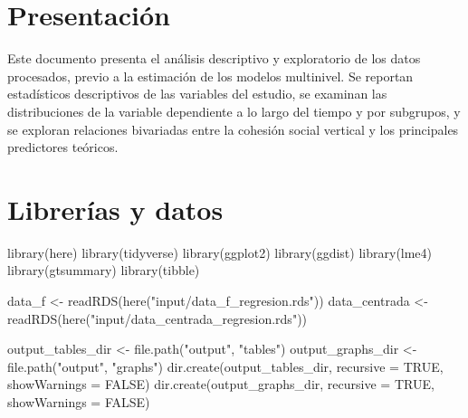 \documentclass[
  spanish,
  a4paper,
  oneside]{scrbook}
\newenvironment{Shaded}{\begin{snugshade}}{\end{snugshade}}
\newcommand{\AttributeTok}[1]{\textcolor[rgb]{0.40,0.45,0.13}{#1}}
\newcommand{\ConstantTok}[1]{\textcolor[rgb]{0.56,0.35,0.01}{#1}}
\newcommand{\FunctionTok}[1]{\textcolor[rgb]{0.28,0.35,0.67}{#1}}
\newcommand{\NormalTok}[1]{\textcolor[rgb]{0.00,0.23,0.31}{#1}}
\newcommand{\OtherTok}[1]{\textcolor[rgb]{0.00,0.23,0.31}{#1}}
\newcommand{\StringTok}[1]{\textcolor[rgb]{0.13,0.47,0.30}{#1}}
\begin{document}
\chapter{Presentación}\label{presentaciuxf3n-1}

Este documento presenta el análisis descriptivo y exploratorio de los
datos procesados, previo a la estimación de los modelos multinivel. Se
reportan estadísticos descriptivos de las variables del estudio, se
examinan las distribuciones de la variable dependiente a lo largo del
tiempo y por subgrupos, y se exploran relaciones bivariadas entre la
cohesión social vertical y los principales predictores teóricos.

\chapter{Librerías y datos}\label{libreruxedas-y-datos}

\begin{Shaded}
\begin{Highlighting}[]
\FunctionTok{library}\NormalTok{(here)}
\FunctionTok{library}\NormalTok{(tidyverse)}
\FunctionTok{library}\NormalTok{(ggplot2)}
\FunctionTok{library}\NormalTok{(ggdist)}
\FunctionTok{library}\NormalTok{(lme4)}
\FunctionTok{library}\NormalTok{(gtsummary)}
\FunctionTok{library}\NormalTok{(tibble)}

\NormalTok{data\_f        }\OtherTok{\textless{}{-}} \FunctionTok{readRDS}\NormalTok{(}\FunctionTok{here}\NormalTok{(}\StringTok{"input/data\_f\_regresion.rds"}\NormalTok{))}
\NormalTok{data\_centrada }\OtherTok{\textless{}{-}} \FunctionTok{readRDS}\NormalTok{(}\FunctionTok{here}\NormalTok{(}\StringTok{"input/data\_centrada\_regresion.rds"}\NormalTok{))}

\NormalTok{output\_tables\_dir }\OtherTok{\textless{}{-}} \FunctionTok{file.path}\NormalTok{(}\StringTok{"output"}\NormalTok{, }\StringTok{"tables"}\NormalTok{)}
\NormalTok{output\_graphs\_dir }\OtherTok{\textless{}{-}} \FunctionTok{file.path}\NormalTok{(}\StringTok{"output"}\NormalTok{, }\StringTok{"graphs"}\NormalTok{)}
\FunctionTok{dir.create}\NormalTok{(output\_tables\_dir, }\AttributeTok{recursive =} \ConstantTok{TRUE}\NormalTok{, }\AttributeTok{showWarnings =} \ConstantTok{FALSE}\NormalTok{)}
\FunctionTok{dir.create}\NormalTok{(output\_graphs\_dir, }\AttributeTok{recursive =} \ConstantTok{TRUE}\NormalTok{, }\AttributeTok{showWarnings =} \ConstantTok{FALSE}\NormalTok{)}
\end{Highlighting}
\end{Shaded}
\end{document}
